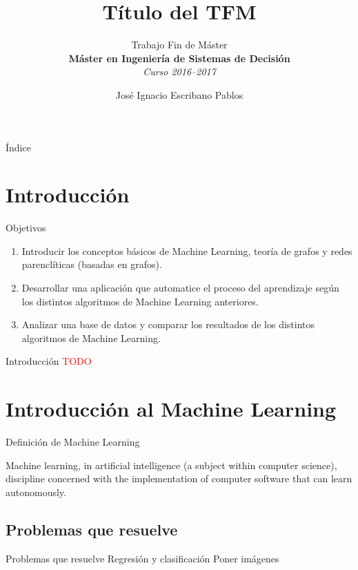 \documentclass[hyperref={unicode}]{beamer}
\title{Título del TFM}
\subtitle{Trabajo Fin de Máster \\ \textbf{Máster en Ingeniería de Sistemas de Decisión} \\ \textit{Curso 2016--2017}}
\author{José Ignacio Escribano Pablos}
\institute{Ana Elizabeth García Sipols \\ Miguel Romance del Río}
\begin{document}
\setcounter{showProgressBar}{0}
\setcounter{showSlideNumbers}{0}

\frame{\titlepage}

\begin{frame}{Índice}
	\tableofcontents
\end{frame}

\setcounter{framenumber}{0}
\setcounter{showProgressBar}{1}
\setcounter{showSlideNumbers}{1}
\section{Introducción}
\begin{frame}{Objetivos}
	\begin{enumerate}
		\item Introducir los conceptos básicos de Machine Learning, teoría de grafos y redes parenclíticas (basadas en grafos).
		
		\item \pause Desarrollar una aplicación que automatice el proceso del aprendizaje según los distintos algoritmos de Machine Learning anteriores.
		
		\item \pause Analizar una base de datos y comparar los resultados de los distintos algoritmos de Machine Learning.
	\end{enumerate}
\end{frame}

\begin{frame}{Introducción}
	\Huge{\textcolor{red}{TODO}}
\end{frame}

\section{Introducción al Machine Learning}
\begin{frame}{Definición de Machine Learning}
	\begin{fancyquotes}
		Machine learning, in artificial intelligence (a subject within computer science), discipline concerned with the implementation of computer software that can learn autonomously.
	\end{fancyquotes}
\end{frame}

\subsection{Problemas que resuelve}
\begin{frame}{Problemas que resuelve}
Regresión y clasificación
Poner imágenes
\end{frame}
\end{document}
